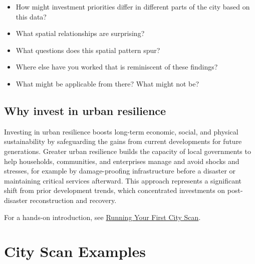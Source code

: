 \documentclass[
  letterpaper,
  DIV=11,
  numbers=noendperiod]{scrreprt}
\providecommand{\tightlist}{%
  \setlength{\itemsep}{0pt}\setlength{\parskip}{0pt}}
\begin{document}
\begin{itemize}
\tightlist
\item
  How might investment priorities differ in different parts of the city
  based on this data?
\item
  What spatial relationships are surprising?
\item
  What questions does this spatial pattern spur?
\item
  Where else have you worked that is reminiscent of these findings?
\item
  What might be applicable from there? What might not be?
\end{itemize}

\section{Why invest in urban
resilience}\label{why-invest-in-urban-resilience}

Investing in urban resilience boosts long-term economic, social, and
physical sustainability by safeguarding the gains from current
developments for future generations. Greater urban resilience builds the
capacity of local governments to help households, communities, and
enterprises manage and avoid shocks and stresses, for example by
damage-proofing infrastructure before a disaster or maintaining critical
services afterward. This approach represents a significant shift from
prior development trends, which concentrated investments on
post-disaster reconstruction and recovery.

\begin{tcolorbox}[enhanced jigsaw, arc=.35mm, bottomrule=.15mm, bottomtitle=1mm, breakable, colback=white, colbacktitle=quarto-callout-note-color!10!white, colframe=quarto-callout-note-color-frame, coltitle=black, left=2mm, leftrule=.75mm, opacityback=0, opacitybacktitle=0.6, rightrule=.15mm, title=\textcolor{quarto-callout-note-color}{\faInfo}\hspace{0.5em}{Note}, titlerule=0mm, toprule=.15mm, toptitle=1mm]

For a hands-on introduction, see
\href{running-first-cityscan.qmd}{Running Your First City Scan}.

\end{tcolorbox}

\chapter{City Scan Examples}\label{city-scan-examples}
\end{document}
